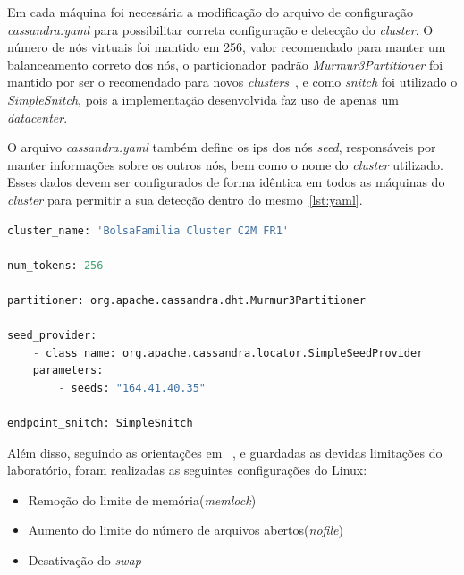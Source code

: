 Em cada máquina foi necessária a modificação do arquivo de configuração \emph{cassandra.yaml} para possibilitar correta configuração e detecção do \emph{cluster}. O número de nós virtuais foi mantido em 256, valor recomendado para manter um balanceamento correto dos nós, o particionador padrão \emph{Murmur3Partitioner} foi mantido por ser o recomendado para novos \emph{clusters}~\cite{cassandrapartitioners}, e como \emph{snitch} foi utilizado o \emph{SimpleSnitch}, pois a implementação desenvolvida faz uso de apenas um \emph{datacenter}. 

O arquivo \emph{cassandra.yaml} também define os ips dos nós \emph{seed}, responsáveis por manter informações sobre os outros nós, bem como o nome do \emph{cluster} utilizado. Esses dados devem ser configurados de forma idêntica em todos as máquinas do \emph{cluster} para permitir a sua detecção dentro do mesmo~\ref{lst:yaml}.

\begin{lstlisting}[caption={Configuração cassandra.yaml},label={lst:yaml},language=python]
cluster_name: 'BolsaFamilia Cluster C2M FR1'

num_tokens: 256

partitioner: org.apache.cassandra.dht.Murmur3Partitioner

seed_provider:
	- class_name: org.apache.cassandra.locator.SimpleSeedProvider
	parameters:
		- seeds: "164.41.40.35"

endpoint_snitch: SimpleSnitch

\end{lstlisting}

Além disso, seguindo as orientações em ~\cite{cassandrasettings}, e guardadas as devidas limitações do laboratório, foram realizadas as seguintes configurações do Linux:
\begin{itemize}
	\item Remoção do limite de memória(\emph{memlock})
	\item Aumento do limite do número de arquivos abertos(\emph{nofile})
	\item Desativação do \emph{swap}
\end{itemize}




